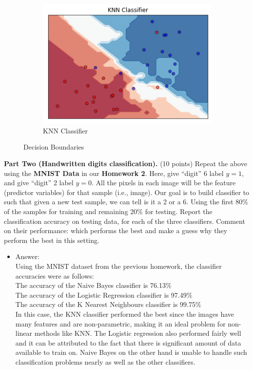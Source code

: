 \documentclass[twoside,10pt]{article}
\begin{document}
\begin{enumerate}
\begin{enumerate}
\begin{itemize}
\begin{figure}
\begin{subfigure}{.3\textwidth}
  \centering
  \includegraphics[width=.8\linewidth]{KNNDecisionBoundary.png}
  \caption{KNN Classifier}
  \label{fig:sfig2}
\end{subfigure}
\caption{Decision Boundaries}
\label{fig:fig}
\end{figure}
	
	\end{itemize}
\end{enumerate}

\textbf{Part Two (Handwritten digits classification).} (10 points) Repeat the above using the \textbf{MNIST Data} in our \textbf{Homework 2}. Here, give ``digit'' 6 label $y = 1$, and give ``digit'' 2 label $y = 0$. All the pixels in each image will be the feature (predictor variables) for that sample (i.e., image). Our goal is to build classifier to such that given a new test sample, we can tell is it a 2 or a 6. Using the first $80\%$ of the samples for training and remaining $20\%$ for testing. Report the classification accuracy on testing data, for each of the three classifiers. Comment on their performance: which performs the best and make a guess why they perform the best in this setting. 
\begin{itemize}
\item Answer:\\
Using the MNIST dataset from the previous homework, the classifier accuracies were as follows:\\
The accuracy of the Naive Bayes classifier is 76.13\%\\
The accuracy of the Logistic Regression classifier is 97.49\%\\
The accuracy of the K Nearest Neighbours classifier is 99.75\%\\

In this case, the KNN classifier performed the best since the images have many features and are non-parametric, making it an ideal problem for non-linear methods like KNN. The Logistic regression also performed fairly well and it can be attributed to the fact that there is significant amount of data available to train on. Naive Bayes on the other hand is unable to handle such classification problems nearly as well as the other classifiers.


\end{itemize}
\end{enumerate}
\end{document}
